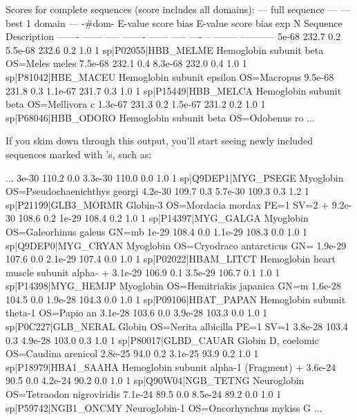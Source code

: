 \begin{samepage}
\begin{sreoutput}
Scores for complete sequences (score includes all domains):
   --- full sequence ---   --- best 1 domain ---    -#dom-
    E-value  score  bias    E-value  score  bias    exp  N  Sequence              Description
    ------- ------ -----    ------- ------ -----   ---- --  --------              -----------
      5e-68  232.7   0.2    5.5e-68  232.6   0.2    1.0  1  sp|P02055|HBB_MELME    Hemoglobin subunit beta OS=Meles meles
    7.5e-68  232.1   0.4    8.3e-68  232.0   0.4    1.0  1  sp|P81042|HBE_MACEU    Hemoglobin subunit epsilon OS=Macropus
    9.5e-68  231.8   0.3    1.1e-67  231.7   0.3    1.0  1  sp|P15449|HBB_MELCA    Hemoglobin subunit beta OS=Mellivora c
    1.3e-67  231.3   0.2    1.5e-67  231.2   0.2    1.0  1  sp|P68046|HBB_ODORO    Hemoglobin subunit beta OS=Odobenus ro
...
\end{sreoutput}
\end{samepage}

If you skim down through this output, you'll start seeing newly
included sequences marked with \ccode{+}'s, such as:

\begin{samepage}
\begin{sreoutput}
...
      3e-30  110.2   0.0    3.3e-30  110.0   0.0    1.0  1  sp|Q9DEP1|MYG_PSEGE    Myoglobin OS=Pseudochaenichthys georgi
    4.2e-30  109.7   0.3    5.7e-30  109.3   0.3    1.2  1  sp|P21199|GLB3_MORMR   Globin-3 OS=Mordacia mordax PE=1 SV=2
+   9.2e-30  108.6   0.2      1e-29  108.4   0.2    1.0  1  sp|P14397|MYG_GALGA    Myoglobin OS=Galeorhinus galeus GN=mb 
      1e-29  108.4   0.0    1.1e-29  108.3   0.0    1.0  1  sp|Q9DEP0|MYG_CRYAN    Myoglobin OS=Cryodraco antarcticus GN=
    1.9e-29  107.6   0.0    2.1e-29  107.4   0.0    1.0  1  sp|P02022|HBAM_LITCT   Hemoglobin heart muscle subunit alpha-
+   3.1e-29  106.9   0.1    3.5e-29  106.7   0.1    1.0  1  sp|P14398|MYG_HEMJP    Myoglobin OS=Hemitriakis japanica GN=m
    1.6e-28  104.5   0.0    1.9e-28  104.3   0.0    1.0  1  sp|P09106|HBAT_PAPAN   Hemoglobin subunit theta-1 OS=Papio an
    3.1e-28  103.6   0.0    3.9e-28  103.3   0.0    1.0  1  sp|P0C227|GLB_NERAL    Globin OS=Nerita albicilla PE=1 SV=1
    3.8e-28  103.4   0.3    4.9e-28  103.0   0.3    1.0  1  sp|P80017|GLBD_CAUAR   Globin D, coelomic OS=Caudina arenicol
    2.8e-25   94.0   0.2    3.1e-25   93.9   0.2    1.0  1  sp|P18979|HBA1_SAAHA   Hemoglobin subunit alpha-1 (Fragment) 
+   3.6e-24   90.5   0.0    4.2e-24   90.2   0.0    1.0  1  sp|Q90W04|NGB_TETNG    Neuroglobin OS=Tetraodon nigroviridis 
    7.1e-24   89.5   0.0    8.5e-24   89.2   0.0    1.0  1  sp|P59742|NGB1_ONCMY   Neuroglobin-1 OS=Oncorhynchus mykiss G
...
\end{sreoutput}
\end{samepage}

